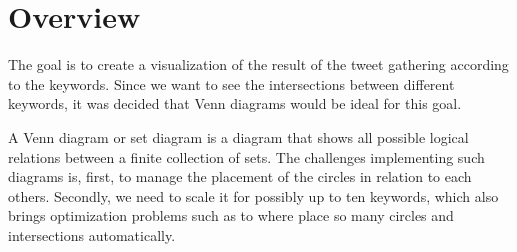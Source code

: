 \section{Overview}
The goal is to create a visualization of the result of the tweet gathering according to the keywords. Since we want to see the intersections between different keywords, it was decided that Venn diagrams would be ideal for this goal.

A Venn diagram or set diagram is a diagram that shows all possible logical relations between a finite collection of sets. The challenges implementing such diagrams is, first, to manage the placement of the circles in relation to each others. Secondly, we need to scale it for possibly up to ten keywords, which also brings optimization problems such as to where place so many circles and intersections automatically.
